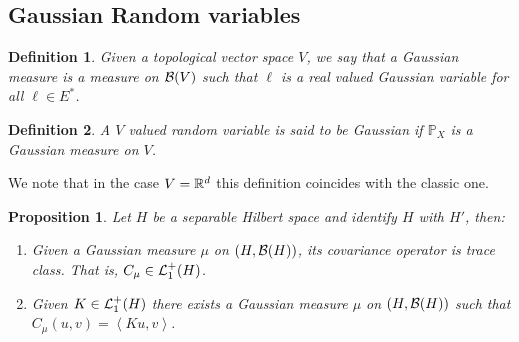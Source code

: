 \documentclass[12pt]{article}
\newtheorem{proposition}{Proposition}
\newtheorem{definition}{Definition}
\newcommand{\br}[1]{\left\langle#1\right\rangle}
\begin{document}
\subsection{Gaussian Random variables}
\begin{definition}
	Given a topological vector space $V$, we say that a \emph{Gaussian measure } is a measure on $\mathcal{B}(V)$ such that $\ell $ is a real valued Gaussian variable for all $\ell \in E^*$.
\end{definition}
\begin{definition}
	A $V$ valued random variable is said to be Gaussian if $\mathbb{P}_X$ is a Gaussian measure on $V$.
\end{definition}
We note that in the case $V={\mathbb R}^d$ this definition coincides with the classic one.
\begin{proposition}\label{covarianceariance kernel gaussian} Let $H$ be a separable Hilbert space and identify  $H$ with $H'$, then:
	\begin{enumerate}
		\item Given a Gaussian measure $\mu $ on  $(H,\mathcal{B}(H))$, its covariance operator is trace class. That is, $C_\mu \in \mathcal{L}_1^+(H)$.
		\item Given $K\in \mathcal{L}_1^+(H)$ there exists a Gaussian measure $\mu $ on $(H,\mathcal{B}(H))$ such that $C_\mu(u,v)=\br{Ku ,v}$.
	\end{enumerate}
\end{proposition}
\end{document}

